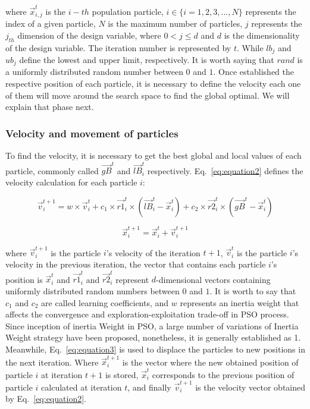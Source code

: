 \noindent where $\vec{x}_{i,j}^t$ is the $i-th$ population particle, $i \in \{i=1,2,3,...,N\}$ represents the index of a given particle, $N$ is the maximum number of particles, $j$ represents the $j_{th}$ dimension of the design variable, where $0<j\leq d$ and $d$ is the dimensionality of the design variable. The iteration number is represented by $t$. While $lb_j$ and $ub_j$ define the lowest and upper limit, respectively. It is worth saying that $rand$ is a uniformly distributed random number between $0$ and $1$. Once established the respective position of each particle, it is necessary to define the velocity each one of them will move around the search space to find the global optimal. We will explain that phase next.

\subsubsection{Velocity and movement of particles}

To find the velocity, it is necessary to get the best global and local values of each particle, commonly called $\vec{gB}^t$ and $\vec{lB}_i^t$ respectively. Eq.~\ref{eq:equation2} defines the velocity calculation for each particle $i$:

\begin{equation}
\vec{v}_i^{t+1}=w \times \vec{v}_i^{t}+c_{1} \times \vec{r1}_i^t \times (\vec{lB}_i^t-\vec{x}^{t}_i)+c_{2} \times \vec{r2}_i^t \times (\vec{gB}^t-\vec{x}^{t}_i)
\label{eq:equation2}
\end{equation}

\begin{equation}
\vec{x}_i^{t+1}=\vec{x}_i^{t}+\vec{v}_i^{t+1}
\label{eq:equation3}
\end{equation}

\noindent where $\vec{v}_i^{t+1}$ is the particle $i$'s velocity of the iteration $t+1$, $\vec{v}_i^{t}$ is the particle $i$'s velocity in the previous iteration, the vector that contains each particle $i$'s position is $\vec{x}_i^{t}$ and $\vec{r1}_i^t$ and $\vec{r2}_i^t$ represent $d$-dimensional vectors containing uniformly distributed random numbers between $0$ and $1$. It is worth to say that $c_{1}$ and $c_{2}$ are called learning coefficients, and $w$ represents an inertia weight that affects the convergence and exploration-exploitation trade-off in PSO process. Since inception of inertia Weight in PSO, a large number of variations of Inertia Weight strategy have been proposed, nonetheless, it is generally established as 1. Meanwhile, Eq.~\ref{eq:equation3} is used to displace the particles to new positions in the next iteration. Where $\vec{x}_i^{t+1}$ is the vector where the new obtained position of particle $i$ at iteration $t+1$ is stored, $\vec{x}_i^{t}$ corresponds to the previous position of particle $i$ calculated at iteration $t$, and finally $\vec{v}_i^{t+1}$ is the velocity vector obtained by Eq.~\ref{eq:equation2}.

